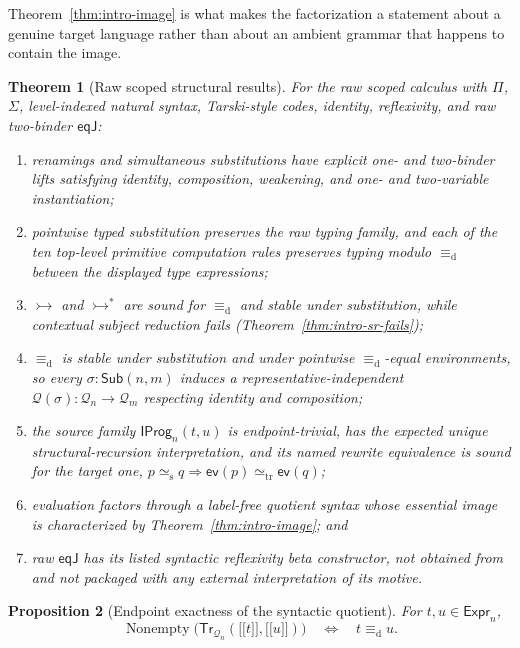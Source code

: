 \documentclass[10pt,reqno]{amsart}
\newtheorem{theorem}{Theorem}[section]
\newtheorem{proposition}[theorem]{Proposition}
\newcommand{\Expr}{\mathsf{Expr}}
\newcommand{\Sub}{\mathsf{Sub}}
\newcommand{\EqJ}{\mathsf{eqJ}}
\newcommand{\Tr}{\mathsf{Tr}}
\newcommand{\TrEq}{\mathrel{\simeq_{\mathrm{tr}}}}
\newcommand{\IProg}{\mathsf{IProg}}
\newcommand{\ev}{\mathsf{ev}}
\newcommand{\den}[1]{\mathopen{\lbrack\!\lbrack}#1\mathclose{\rbrack\!\rbrack}}
\newcommand{\defeq}{\mathrel{\equiv_{\mathrm d}}}
\newcommand{\ctxred}{\mathrel{\rightarrowtail}}
\newcommand{\ctxredstar}{\mathrel{\rightarrowtail^{*}}}
\newcommand{\srweq}{\mathrel{\simeq_{\mathrm s}}}
\newcommand{\Q}{\mathcal{Q}}
\begin{document}
Theorem~\ref{thm:intro-image} is what makes the factorization a statement about
a genuine target language rather than about an ambient grammar that happens to
contain the image.

\begin{theorem}[Raw scoped structural results]
\label{thm:intro-main}
For the raw scoped calculus with \(\Pi\), \(\Sigma\), level-indexed natural
syntax, Tarski-style codes, identity, reflexivity, and raw two-binder
\(\EqJ\):
\begin{enumerate}
\item renamings and simultaneous substitutions have explicit one- and
  two-binder lifts satisfying identity, composition, weakening, and one- and
  two-variable instantiation;
\item pointwise typed substitution preserves the raw typing family, and each of
  the ten top-level primitive computation rules preserves typing modulo
  \(\defeq\) between the displayed type expressions;
\item \(\ctxred\) and \(\ctxredstar\) are sound for \(\defeq\) and stable under
  substitution, while contextual subject reduction fails
  (Theorem~\ref{thm:intro-sr-fails});
\item \(\defeq\) is stable under substitution and under pointwise
  \(\defeq\)-equal environments, so every \(\sigma:\Sub(n,m)\) induces a
  representative-independent \(\Q(\sigma):\Q_n\to\Q_m\) respecting identity and
  composition;
\item the source family \(\IProg_n(t,u)\) is endpoint-trivial, has the expected
  unique structural-recursion interpretation, and its named rewrite equivalence
  is sound for the target one, \(p\srweq q\Rightarrow\ev(p)\TrEq\ev(q)\);
\item evaluation factors through a label-free quotient syntax whose essential
  image is characterized by Theorem~\ref{thm:intro-image}; and
\item raw \(\EqJ\) has its listed syntactic reflexivity beta constructor, not
  obtained from and not packaged with any external interpretation of its
  motive.
\end{enumerate}
\end{theorem}

\begin{proposition}[Endpoint exactness of the syntactic quotient]
\label{prop:intro-endpoint}
For \(t,u\in\Expr_n\),
\[
 \operatorname{Nonempty}\bigl(\Tr_{\Q_n}(\den t,\den u)\bigr)
 \quad\Longleftrightarrow\quad t\defeq u.
\tag{1.3}\label{eq:intro-endpoint}
\]
\end{proposition}
\end{document}
